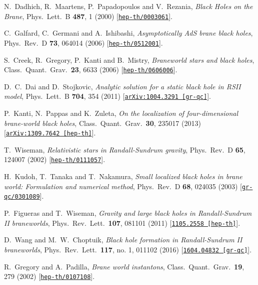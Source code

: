 \documentclass[aps,12pt,prd,superscriptaddress,preprintnumbers, 
	amssymb,
	amsmath,
	notitlepage,
	longbibliography,
	nofootinbib]{revtex4-1}
\begin{document}
\begin{thebibliography}{10}
N.~Dadhich, R.~Maartens, P.~Papadopoulos and V.~Rezania,
{\it Black Holes on the Brane},
Phys.\ Lett.\ B {\bf 487}, 1 (2000)
[\href{http://xxx.lanl.gov/abs/hep-th/0003061}{{\tt hep-th/0003061}}].

C.~Galfard, C.~Germani and A.~Ishibashi,
{\it Asymptotically AdS brane black holes},
Phys.\ Rev.\ D {\bf 73}, 064014 (2006)
[\href{http://xxx.lanl.gov/abs/hep-th/0512001}{{\tt hep-th/0512001}}].

S.~Creek, R.~Gregory, P.~Kanti and B.~Mistry,
{\it Braneworld stars and black holes},
Class.\ Quant.\ Grav.\  {\bf 23}, 6633 (2006)
[\href{http://xxx.lanl.gov/abs/hep-th/0606006}{{\tt hep-th/0606006}}].

D.~C.~Dai and D.~Stojkovic,
{\it Analytic solution for a static black hole in RSII model},
Phys.\ Lett.\ B {\bf 704}, 354 (2011)
[\href{http://xxx.lanl.gov/abs/1004.3291}{{\tt arXiv:1004.3291 [gr-qc]}}].

P.~Kanti, N.~Pappas and K.~Zuleta,
{\it On the localization of four-dimensional brane-world black holes},
Class.\ Quant.\ Grav.\  {\bf 30}, 235017 (2013)
[\href{http://xxx.lanl.gov/abs/1309.7642}{{\tt arXiv:1309.7642 [hep-th]}}].

T.~Wiseman,
{\it Relativistic stars in Randall-Sundrum gravity},
Phys.\ Rev.\ D {\bf 65}, 124007 (2002)
[\href{http://xxx.lanl.gov/abs/hep-th/0111057}{{\tt hep-th/0111057}}].

H.~Kudoh, T.~Tanaka and T.~Nakamura,
{\it Small localized black holes in brane world: Formulation and numerical method},
Phys.\ Rev.\ D {\bf 68}, 024035 (2003)
[\href{http://xxx.lanl.gov/abs/gr-qc/0301089}{{\tt gr-qc/0301089}}].

P.~Figueras and T.~Wiseman,
{\it Gravity and large black holes in Randall-Sundrum II braneworlds},
Phys.\ Rev.\ Lett.\  {\bf 107}, 081101 (2011)
[\href{http://xxx.lanl.gov/abs/1105.2558}{{\tt 1105.2558 [hep-th]}}].

D.~Wang and M.~W.~Choptuik,
{\it Black hole formation in Randall-Sundrum II braneworlds},
Phys.\ Rev.\ Lett.\  {\bf 117}, no. 1, 011102 (2016)
[\href{http://xxx.lanl.gov/abs/1604.04832}{{\tt 1604.04832 [gr-qc]}}].

R.~Gregory and A.~Padilla,
{\it Brane world instantons},
Class.\ Quant.\ Grav.\  {\bf 19}, 279 (2002)
[\href{http://xxx.lanl.gov/abs/hep-th/0107108}{{\tt hep-th/0107108}}].


\end{thebibliography}
\end{document}

